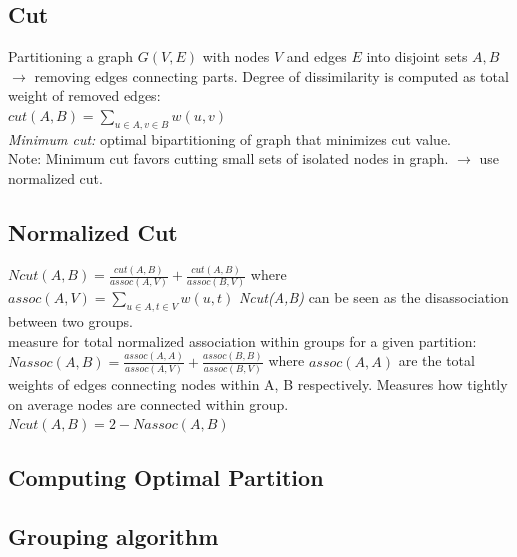 \documentclass[9pt,parskip]{scrartcl}
\begin{document}
\begin{multicols*}{4}
\subsection*{Cut}
Partitioning a graph $G(V,E)$ with nodes $V$ and edges $E$ into disjoint sets $A,B$ $\to$ removing edges connecting parts. Degree of dissimilarity is computed as total weight of removed edges: \\
$cut(A,B) = \sum_{u \in A, v \in B} w(u,v)$ \\
\textit{Minimum cut: } optimal bipartitioning of graph that minimizes cut value. \\
Note: Minimum cut favors cutting small sets of isolated nodes in graph. $\to $ use normalized cut.
\subsection*{Normalized Cut}
$Ncut(A,B) = \frac{cut(A,B)}{assoc(A,V)} + \frac{cut(A,B)}{assoc(B,V)}$ where $assoc(A,V) = \sum_{u \in A, t \in V} w(u,t) $
\textit{Ncut(A,B)} can be seen as the disassociation between two groups. \\
 measure for total
normalized association within groups for a given partition:\\
$Nassoc(A,B) = \frac{assoc(A,A)}{assoc(A,V)} + \frac{assoc(B,B)}{assoc(B,V)}$ where $assoc(A,A) $ are the total weights of edges connecting nodes within A, B respectively. Measures how tightly on average nodes are connected within group. \\
$Ncut(A,B) = 2 - Nassoc(A,B)$ \\
\subsection*{Computing Optimal Partition}

\subsection*{Grouping algorithm}
\end{multicols*}
\end{document}
